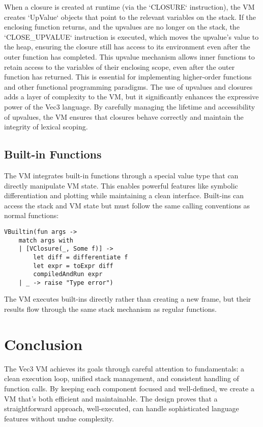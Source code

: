 When a closure is created at runtime (via the `CLOSURE` instruction), the VM creates `UpValue` objects that point to the relevant variables on the stack. If the enclosing function returns, and the upvalues are no longer on the stack, the `CLOSE_UPVALUE` instruction is executed, which moves the upvalue's value to the heap, ensuring the closure still has access to its environment even after the outer function has completed.
This upvalue mechanism allows inner functions to retain access to the variables of their enclosing scope, even after the outer function has returned. This is essential for implementing higher-order functions and other functional programming paradigms. The use of upvalues and closures adds a layer of complexity to the VM, but it significantly enhances the expressive power of the Vec3 language. By carefully managing the lifetime and accessibility of upvalues, the VM ensures that closures behave correctly and maintain the integrity of lexical scoping.

\subsection{Built-in Functions}\label{subsec:built-in-functions}
The VM integrates built-in functions through a special value type that can directly manipulate VM state.
This enables powerful features like symbolic differentiation and plotting while maintaining a clean interface.
Built-ins can access the stack and VM state but must follow the same calling conventions as normal functions:

\begin{verbatim}
VBuiltin(fun args ->
    match args with
    | [VClosure(_, Some f)] ->
        let diff = differentiate f
        let expr = toExpr diff
        compiledAndRun expr
    | _ -> raise "Type error")
\end{verbatim}
The VM executes built-ins directly rather than creating a new frame, but their results flow through the same stack mechanism as regular functions.

\section{Conclusion}\label{sec:conclusion}
The Vec3 VM achieves its goals through careful attention to fundamentals: a clean execution loop, unified stack management, and consistent handling of function calls.
By keeping each component focused and well-defined, we create a VM that's both efficient and maintainable.
The design proves that a straightforward approach, well-executed, can handle sophisticated language features without undue complexity.

